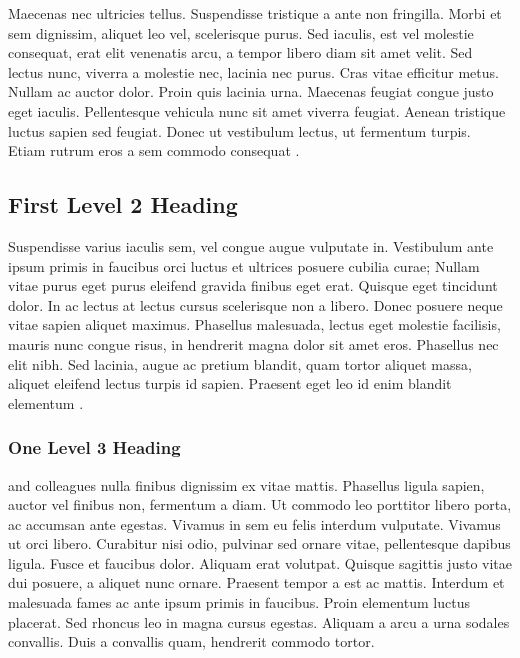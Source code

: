 \maketitle




Maecenas nec ultricies tellus. Suspendisse tristique a ante non fringilla. Morbi et sem dignissim, aliquet leo vel, scelerisque purus. Sed iaculis, est vel molestie consequat, erat elit venenatis arcu, a tempor libero diam sit amet velit. Sed lectus nunc, viverra a molestie nec, lacinia nec purus. Cras vitae efficitur metus. Nullam ac auctor dolor. Proin quis lacinia urna. Maecenas feugiat congue justo eget iaculis. Pellentesque vehicula nunc sit amet viverra feugiat. Aenean tristique luctus sapien sed feugiat. Donec ut vestibulum lectus, ut fermentum turpis. Etiam rutrum eros a sem commodo consequat \parencite{ludtke:2008}.

\subsection{First Level 2 Heading}

Suspendisse varius iaculis sem, vel congue augue vulputate in. Vestibulum ante ipsum primis in faucibus orci luctus et ultrices posuere cubilia curae; Nullam vitae purus eget purus eleifend gravida finibus eget erat. Quisque eget tincidunt dolor. In ac lectus at lectus cursus scelerisque non a libero. Donec posuere neque vitae sapien aliquet maximus. Phasellus malesuada, lectus eget molestie facilisis, mauris nunc congue risus, in hendrerit magna dolor sit amet eros. Phasellus nec elit nibh. Sed lacinia, augue ac pretium blandit, quam tortor aliquet massa, aliquet eleifend lectus turpis id sapien. Praesent eget leo id enim blandit elementum \parencite{marsh:2009}.

\subsubsection{One Level 3 Heading}

\citeauthor{marsh:2009} and colleagues \citeyear{marsh:2009} nulla finibus dignissim ex vitae mattis. Phasellus ligula sapien, auctor vel finibus non, fermentum a diam. Ut commodo leo porttitor libero porta, ac accumsan ante egestas. Vivamus in sem eu felis interdum vulputate. Vivamus ut orci libero. Curabitur nisi odio, pulvinar sed ornare vitae, pellentesque dapibus ligula. Fusce et faucibus dolor. Aliquam erat volutpat. Quisque sagittis justo vitae dui posuere, a aliquet nunc ornare. Praesent tempor a est ac mattis. Interdum et malesuada fames ac ante ipsum primis in faucibus. Proin elementum luctus placerat. Sed rhoncus leo in magna cursus egestas. Aliquam a arcu a urna sodales convallis. Duis a convallis quam, hendrerit commodo tortor.

